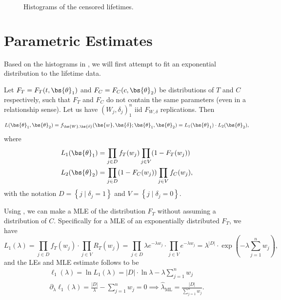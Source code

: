 \begin{table}[h]
    \centering
    
    \caption{Elementary statistics of the data groups. \(\mathop{E} \delta \) denotes the proportion of
    non-censored observations in the set.}
    \label{tab:elementary_stats}
\end{table}

\begin{figure}
    \centering
    \caption{Histograms of the censored lifetimes.}
    \label{fig:histograms}
\end{figure}

\section{Parametric Estimates}%
\label{sec:parametric_estimates}

Based on the histograms in , we will first attempt to fit an exponential distribution to the lifetime data.

\begin{theorem}
    \label{thm:likelihood}
    Let \(F_T=F_T(t,\bs{\theta}_1)\) and \(F_C = F_C(c, \bs{\theta}_2)\) be distributions of \(T\) and \(C\)
    respectively, such that \(F_T\) and \(F_C\) do not contain the same parameters (even in a relationship sense). Let
    us have \((W_j, \delta_j)_1^n\) \ac{iid} \(F_{W,\delta}\) replications. Then
    \[
        L(\bs{\theta}_1, \bs{\theta}_2) = f_{\bs{W}, \bs{\delta}}(\bs{w}, \bs{\delta}; \bs{\theta}_1, \bs{\theta}_2) =
        L_1(\bs{\theta}_1) \cdot L_2(\bs{\theta}_2),
    \] where \[
        \begin{aligned}
            L_1(\bs{\theta}_1) &= \prod_{j\in D} f_T(w_j) \prod_{j \in V} (1 - F_T(w_j)) \\
            L_2(\bs{\theta}_2) &= \prod_{j\in D} (1-F_C(w_j)) \prod_{j \in V} f_C(w_j),
        \end{aligned}
    \] with the notation \(D = \left\{ j \mid \delta_j = 1 \right\}\) and \(V = \left\{ j\mid \delta_j = 0 \right\}\).
\end{theorem}

Using , we can make a \ac{MLE} of the distribution \(F_T\) without assuming a distribution
of \(C\). Specifically for a \ac{MLE} of an exponentially distributed \(F_T\), we have \[
    L_1(\lambda) = \prod_{j\in D} f_T(w_j) \cdot \prod_{j \in V} R_T(w_j) = \prod_{j\in D} \lambda e^{-\lambda w_j}
    \cdot \prod_{j \in V} e^{-\lambda w_j} = \lambda^{|D|} \cdot \exp(-\lambda \sum_{j = 1}^n w_j),
\] and the \ac{LEs} and \ac{MLE} estimate follows to be
\begin{gather*}
    \ell_1(\lambda) = \ln L_1(\lambda) = |D| \cdot \ln \lambda - \lambda \sum_{j = 1}^n w_j \\
    \partial_\lambda\ell_1(\lambda) = \frac{|D|}{\lambda} - \sum_{j = 1}^n w_j = 0 \implies \hat{\lambda}_{\text{ML}}
        = \frac{|D|}{\sum_{j = 1}^n w_j}.
\end{gather*}

